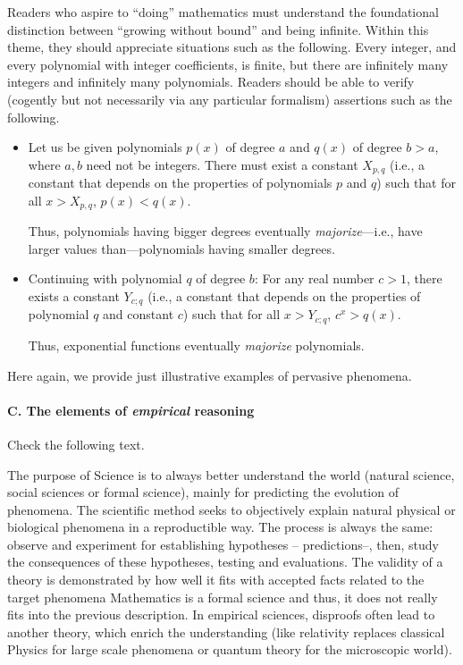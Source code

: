 Readers who aspire to ``doing'' mathematics must understand the
foundational distinction between ``growing without bound'' and being
infinite.  Within this theme, they should appreciate situations such
as the following.  Every integer, and every polynomial with integer
coefficients, is finite, but there are infinitely many integers and
infinitely many polynomials.  Readers should be able to verify
(cogently but not necessarily via any particular formalism) assertions
such as the following.
\begin{itemize}
\item
Let us be given polynomials $p(x)$ of degree $a$ and $q(x)$ of degree
$b > a$, where $a, b$ need not be integers.  There must exist a
constant $X_{p,q}$ (i.e., a constant that depends on the properties of
polynomials $p$ and $q$) such that for all $x > X_{p,q}$, $p(x) <
q(x)$.

Thus, polynomials having bigger degrees eventually {\em
  majorize}---i.e., have larger values than---polynomials having
smaller degrees.

\item
Continuing with polynomial $q$ of degree $b$: For any real number $c >
1$, there exists a constant $Y_{c;q}$ (i.e., a constant that depends
on the properties of polynomial $q$ and constant $c$) such that for
all $x > Y_{c;q}$, $c^x > q(x)$.

Thus, exponential functions eventually {\em majorize} polynomials.
\end{itemize}
Here again, we provide just illustrative examples of pervasive
phenomena.

\medskip

\paragraph{\small\sf C. The elements of {\em empirical} reasoning}

{\Denis Check the following text.}

The purpose of Science is to always better understand the world (natural science, social sciences or formal science),
mainly for predicting the evolution of phenomena.
The scientific method seeks to objectively explain natural physical or biological phenomena in a reproductible way. 
The process is always the same: observe and experiment for establishing hypotheses -- predictions--, then, study the consequences
of these hypotheses, testing and evaluations. 
The validity of a theory is demonstrated by how well it fits with accepted facts related to the target phenomena
Mathematics is a formal science and thus, it does not really fits into the previous description. 
In empirical sciences, disproofs often lead to another theory, which enrich the understanding
(like relativity replaces classical Physics for large scale phenomena or quantum theory for the microscopic world).

